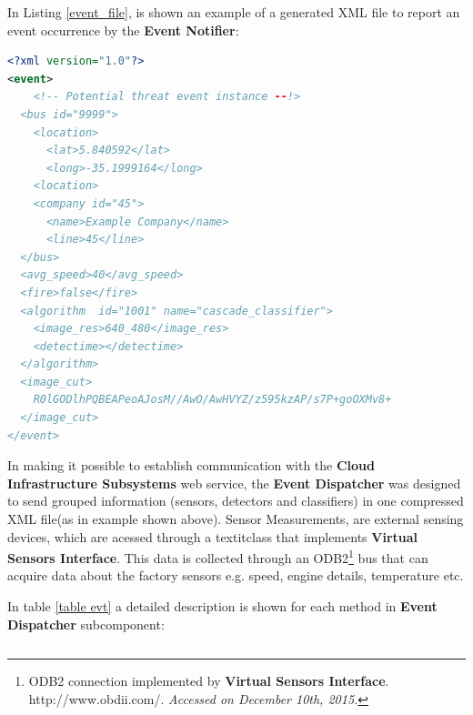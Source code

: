In Listing \ref{event_file}, is shown an example of a generated XML file to report an event occurrence by the \textbf{Event Notifier}:

\begin{changemargin}{0.5cm}{0.5cm} 
\begin{center}
\begin{lstlisting}[caption={Example of an event XML file.},label={event_file},language=XML]
<?xml version="1.0"?>
<event>
    <!-- Potential threat event instance --!>
  <bus id="9999">
    <location>
      <lat>5.840592</lat>
      <long>-35.1999164</long>
    <location>
    <company id="45">
      <name>Example Company</name>
      <line>45</line>
  </bus>
  <avg_speed>40</avg_speed>
  <fire>false</fire>
  <algorithm  id="1001" name="cascade_classifier">
    <image_res>640_480</image_res>
    <detectime></detectime>
  </algorithm>
  <image_cut>
    R0lGODlhPQBEAPeoAJosM//AwO/AwHVYZ/z595kzAP/s7P+goOXMv8+
  </image_cut>  
</event>  
\end{lstlisting}
\end{center}
\end{changemargin}

In making it possible to establish communication with the \textbf{Cloud Infrastructure Subsystems} web service, the \textbf{Event Dispatcher} was designed to send grouped information (sensors, detectors and classifiers) in one compressed XML file(as in example shown above). Sensor Measurements, are external sensing devices, which are acessed through a textit{class} that implements \textbf{Virtual Sensors Interface}. This data is collected through an ODB2\footnote[19]{ODB2 connection implemented by \textbf{Virtual Sensors Interface}. http://www.obdii.com/. \textit{Accessed on December 10th, 2015.}} bus that can acquire data about the factory sensors e.g. speed, engine details, temperature etc.

In table \ref{table evt} a detailed description is shown for each method in \textbf{Event Dispatcher} subcomponent:

\begin{center}
  \label{table evt} %
  \begin{tabular}{|c|c|c|c|c|c|}
  \end{tabular}
\end{center}
\tabulinesep=2.0mm

